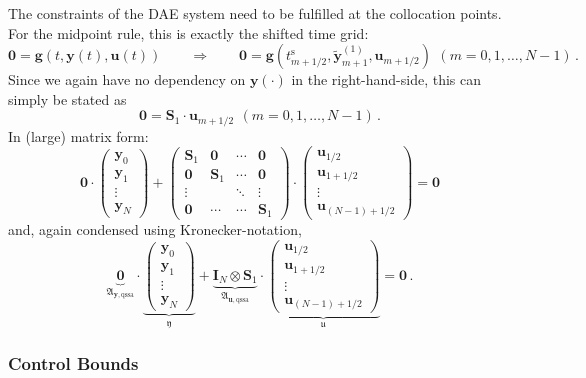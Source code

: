 \documentclass{article}
\newcommand{\kron}{\otimes}%
\newcommand{\vectorfont}[1]{\boldsymbol{#1}}%
\newcommand{\greekvectorfont}[1]{\boldsymbol{#1}}%
\newcommand{\matrixfont}[1]{\mathbf{#1}}%
\newcommand{\gvec}{\vectorfont{g}}
\newcommand{\uvec}{\vectorfont{u}}
\newcommand{\yvec}{\vectorfont{y}}
\newcommand{\tildeyvec}{\vectorfont{\tilde{y}}}
\newcommand{\ufrakvec}{\vectorfont{\mathfrak{u}}}
\newcommand{\yfrakvec}{\vectorfont{\mathfrak{y}}}
\newcommand{\nullvec}{\greekvectorfont{0}}
\newcommand{\Imat}{\matrixfont{I}}%
\newcommand{\Smat}{\matrixfont{S}}
\newcommand{\Afrakmat}{\matrixfont{\mathfrak{A}}}
\newcommand{\Nullmat}{\matrixfont{0}}
\begin{document}
The constraints of the DAE system need to be fulfilled at the collocation points.
For the midpoint rule, this is exactly the shifted time grid:
\[
\nullvec = \gvec (t, \yvec(t), \uvec(t))
\qquad \Rightarrow\qquad
\nullvec = \gvec(t_{m+1/2}^{\mathrm{s}}, \tildeyvec_{m+1}^{(1)}, \uvec_{m+1/2})\,~(m = 0,1,\ldots,N-1)\,.
\]
Since we again have no dependency on $\yvec(\cdot)$ in the right-hand-side, this can simply be stated as
\[
\nullvec = \Smat_1 \cdot \uvec_{m+1/2}\,~(m = 0,1,\ldots,N-1)\,.
\]
In (large) matrix form:
\[
\Nullmat 
\cdot 
\begin{pmatrix}
	\yvec_0 \\ \yvec_1 \\ \vdots \\ \yvec_N
\end{pmatrix}
+
\begin{pmatrix}
	\Smat_1  & \Nullmat & \cdots & \Nullmat \\
	\Nullmat & \Smat_1  & \cdots & \Nullmat \\
	\vdots   &          & \ddots & \vdots   \\
	\Nullmat & \cdots   & \cdots & \Smat_1
\end{pmatrix}
\cdot 
\begin{pmatrix}
	\uvec_{1/2} \\ \uvec_{1+1/2} \\ \vdots \\ \uvec_{(N-1)+1/2}
\end{pmatrix}
= \nullvec
\]
and, again condensed using Kronecker-notation,
\[
\underbrace{\Nullmat}_{\Afrakmat_{\yvec,\mathrm{qssa}}} 
\cdot 
\underbrace{
\begin{pmatrix}
	\yvec_0 \\ \yvec_1 \\ \vdots \\ \yvec_N
\end{pmatrix}
}_{\yfrakvec}
+
\underbrace{
\Imat_{N} \kron \Smat_1
}_{\Afrakmat_{\uvec, \mathrm{qssa}}}
\cdot 
\underbrace{
\begin{pmatrix}
	\uvec_{1/2} \\ \uvec_{1+1/2} \\ \vdots \\ \uvec_{(N-1)+1/2}
\end{pmatrix}
}_{\ufrakvec}
= \nullvec\,.
\]

\subsubsection*{Control Bounds}
\end{document}
